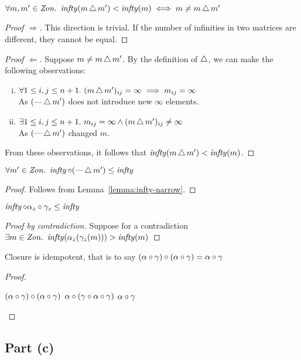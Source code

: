 \begin{lemma}\label{lemma:infty-narrow}
  $\forall m,m^\prime\in\mathit{Zon}.~\operatorname{\mathit{infty}}(m\operatorname{\triangle} m^\prime)<\operatorname{\mathit{infty}}(m)\iff m\neq m\operatorname{\triangle} m^\prime$
  \begin{proof}[Proof $\Rightarrow$]
    This direction is trivial. If the number of infinities in two matrices are different, they cannot be equal.\qedhere
  \end{proof}

  \begin{proof}[Proof $\Leftarrow$]
    Suppose $m\neq m\operatorname{\triangle} m^\prime$. By the definition of $\operatorname{\triangle}$, we can make the following observations:
    \begin{enumerate}[(i)]
      \item $\forall1\leq i,j\leq n+1.~(m\operatorname{\triangle} m^\prime)_{ij}=\infty\implies m_{ij} = \infty$\\
        As $(\text{---}\operatorname{\triangle} m^\prime)$ does not introduce new $\infty$ elements.
      \item $\exists1\leq i,j\leq n+1.~m_{ij}=\infty\wedge(m\operatorname{\triangle} m^\prime)_{ij}\neq\infty$\\
        As $(\text{---}\operatorname{\triangle} m^\prime)$ changed $m$.
    \end{enumerate}
    From these observations, it follows that $\operatorname{\mathit{infty}}(m\operatorname{\triangle} m^\prime)<\operatorname{\mathit{infty}}(m)$.\qedhere
  \end{proof}
\end{lemma}

\begin{corollary}\label{cor:infty-narrow}
  $\forall m^\prime\in\mathit{Zon}.~\operatorname{\mathit{infty}}\circ(\text{---}\operatorname{\triangle} m^\prime)\leq\operatorname{\mathit{infty}}$
  \begin{proof}
    Follows from Lemma~\ref{lemma:infty-narrow}\qedhere.
  \end{proof}
\end{corollary}

\begin{lemma}\label{lemma:infty-closure}
  $\operatorname{\mathit{infty}}\circ\alpha_z\circ\gamma_z\leq\operatorname{\mathit{infty}}$
  \begin{proof}[Proof by contradiction]
    Suppose for a contradiction ${\exists m\in\mathit{Zon}.~\operatorname{\mathit{infty}}(\alpha_z(\gamma_z(m))) > \operatorname{\mathit{infty}}(m)}$
  \end{proof}
\end{lemma}

\begin{lemma}\label{lemma:closure-idemp}
  Closure is idempotent, that is to say
  ${(\alpha\circ\gamma)\circ(\alpha\circ\gamma) = \alpha\circ\gamma}$
  \begin{proof}~\\
    \begin{itemize}
      \step $(\alpha\circ\gamma)\circ(\alpha\circ\gamma)$
      \step[=] $\alpha\circ(\gamma\circ\alpha\circ\gamma)$
      \step[=] $\alpha\circ\gamma$\qedhere
    \end{itemize}
  \end{proof}
\end{lemma}

\subsection{Part (c)}\label{sec:q-1-c}
